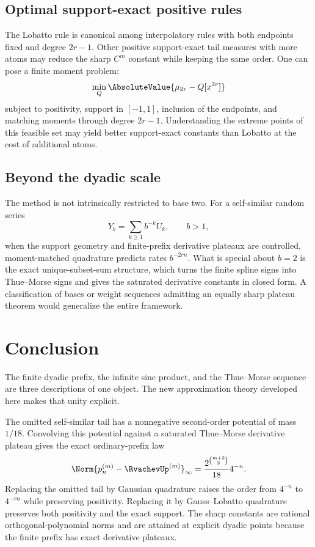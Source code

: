 \documentclass[11pt]{article}
\numberwithin{equation}{section}
\theoremstyle{definition}
\theoremstyle{remark}
\begin{document}
\subsection{Optimal support-exact positive rules}

The Lobatto rule is canonical among interpolatory rules with both endpoints fixed and degree $2r-1$.  Other positive support-exact tail measures with more atoms may reduce the sharp $C^m$ constant while keeping the same order.  One can pose a finite moment problem:
\begin{equation}
 \min_Q \AbsoluteValue{\mu_{2r}-Q[x^{2r}]}
 \label{p1:eq:moment-optimization}
\end{equation}
subject to positivity, support in $[-1,1]$, inclusion of the endpoints, and matching moments through degree $2r-1$.  Understanding the extreme points of this feasible set may yield better support-exact constants than Lobatto at the cost of additional atoms.

\subsection{Beyond the dyadic scale}

The method is not intrinsically restricted to base two.  For a self-similar random series
\[
 Y_b=\sum_{k\ge1}b^{-k}U_k,
 \qquad b>1,
\]
when the support geometry and finite-prefix derivative plateaux are controlled, moment-matched quadrature predicts rates $b^{-2rn}$.  What is special about $b=2$ is the exact unique-subset-sum structure, which turns the finite spline signs into Thue--Morse signs and gives the saturated derivative constants in closed form.  A classification of bases or weight sequences admitting an equally sharp plateau theorem would generalize the entire framework.

\section{Conclusion}
\label{p1:sec:conclusion}

The finite dyadic prefix, the infinite sinc product, and the Thue--Morse sequence are three descriptions of one object.  The new approximation theory developed here makes that unity explicit.

The omitted self-similar tail has a nonnegative second-order potential of mass $1/18$.  Convolving this potential against a saturated Thue--Morse derivative plateau gives the exact ordinary-prefix law
\[
 \Norm{p_n^{(m)}-\RvachevUp^{(m)}}_\infty
 =\frac{2^{\binom{m+3}{2}}}{18}4^{-n}.
\]
Replacing the omitted tail by Gaussian quadrature raises the order from $4^{-n}$ to $4^{-rn}$ while preserving positivity.  Replacing it by Gauss--Lobatto quadrature preserves both positivity and the exact support.  The sharp constants are rational orthogonal-polynomial norms and are attained at explicit dyadic points because the finite prefix has exact derivative plateaux.
\end{document}

